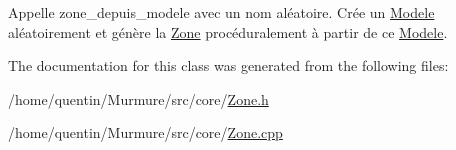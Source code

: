Appelle zone\+\_\+depuis\+\_\+modele avec un nom aléatoire. Crée un \hyperlink{classModele}{Modele} aléatoirement et génère la \hyperlink{classZone}{Zone} procéduralement à partir de ce \hyperlink{classModele}{Modele}. 



The documentation for this class was generated from the following files\+:\begin{DoxyCompactItemize}
\item 
/home/quentin/\+Murmure/src/core/\hyperlink{Zone_8h}{Zone.\+h}\item 
/home/quentin/\+Murmure/src/core/\hyperlink{Zone_8cpp}{Zone.\+cpp}\end{DoxyCompactItemize}
